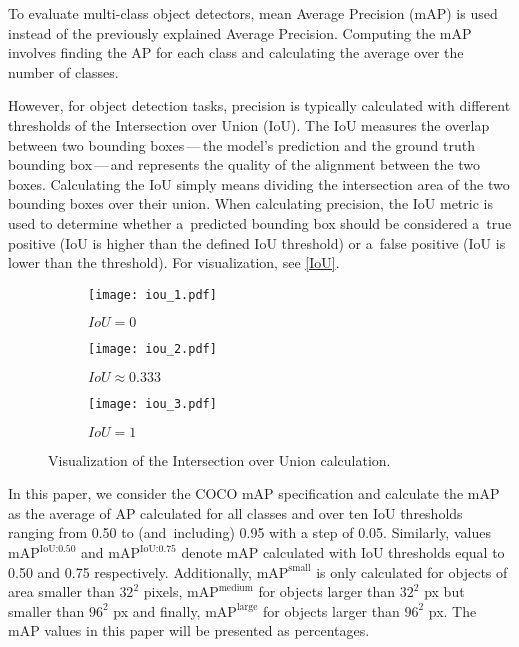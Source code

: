 To evaluate multi-class object detectors, mean Average Precision (mAP) is used
instead of the previously explained Average Precision. Computing the mAP
involves finding the AP for each class and calculating the average over the
number of classes.

However, for object detection tasks, precision is typically calculated with
different thresholds of the Intersection over Union (IoU). The IoU
measures the overlap between two bounding boxes\,---\,the model's
prediction and the ground truth bounding box\,---\,and represents the quality of the
alignment between the two boxes. Calculating the IoU simply means dividing the
intersection area of the two bounding boxes over their union. When calculating
precision, the IoU metric is used to determine whether a~predicted bounding box
should be considered a~true positive (IoU is higher than the defined IoU
threshold) or a~false positive (IoU is lower than the threshold). For
visualization, see \autoref{IoU}.

\begin{figure}[t]
    \centering
    \begin{subfigure}[b]{0.3125\textwidth}
        \texttt{[image: iou\_1.pdf]}
        \caption{$IoU = 0$}
    \end{subfigure}
    \hfill
    \begin{subfigure}[b]{0.2272727\textwidth}
        \texttt{[image: iou\_2.pdf]}
        \caption{$IoU \approx 0.333$}
    \end{subfigure}
    \hfill
    \begin{subfigure}[b]{0.15151515\textwidth}
        \texttt{[image: iou\_3.pdf]}
        \caption{$IoU = 1$}
    \end{subfigure}
    \caption{Visualization of the Intersection over Union calculation.}
    \label{IoU}
\end{figure}

In this paper, we consider the COCO mAP specification and calculate the mAP as
the average of AP calculated for all classes and over ten IoU thresholds ranging
from \num{0.50} to (and~including) \num{0.95} with a step of \num{0.05}.
Similarly, values $\text{mAP}^{\text{IoU:0.50}}$ and
$\text{mAP}^{\text{IoU:0.75}}$ denote mAP calculated with IoU thresholds equal
to \num{0.50} and \num{0.75} respectively. Additionally,
$\text{mAP}^{\text{small}}$ is only calculated for objects of area smaller than
$32^2$ pixels, $\text{mAP}^{\text{medium}}$ for objects larger than $32^2$ px
but smaller than $96^2$ px and finally, $\text{mAP}^{\text{large}}$ for objects
larger than $96^2$ px. The mAP values in this paper will be presented as
percentages.


